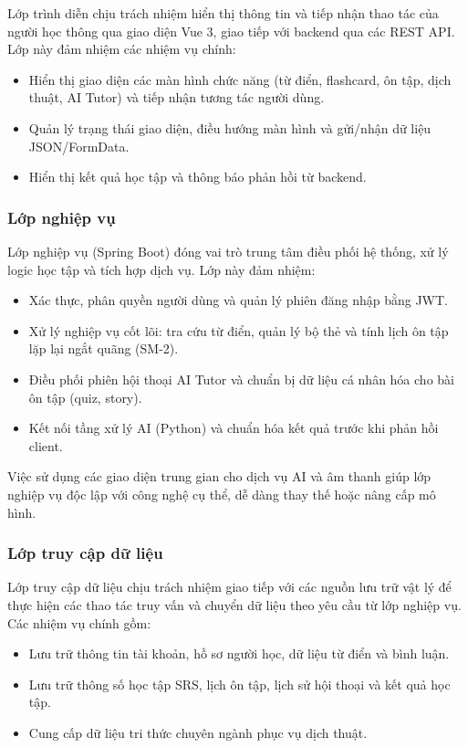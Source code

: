 \documentclass[../DoAn.tex]{subfiles}
\begin{document}
Lớp trình diễn chịu trách nhiệm hiển thị thông tin và tiếp nhận thao tác của người học thông qua giao diện Vue 3, giao tiếp với backend qua các REST API. Lớp này đảm nhiệm các nhiệm vụ chính:

\begin{itemize}
    \item Hiển thị giao diện các màn hình chức năng (từ điển, flashcard, ôn tập, dịch thuật, AI Tutor) và tiếp nhận tương tác người dùng.
    \item Quản lý trạng thái giao diện, điều hướng màn hình và gửi/nhận dữ liệu JSON/FormData.
    \item Hiển thị kết quả học tập và thông báo phản hồi từ backend.
\end{itemize}

\subsubsection{Lớp nghiệp vụ}

Lớp nghiệp vụ (Spring Boot) đóng vai trò trung tâm điều phối hệ thống, xử lý logic học tập và tích hợp dịch vụ. Lớp này đảm nhiệm:

\begin{itemize}
    \item Xác thực, phân quyền người dùng và quản lý phiên đăng nhập bằng JWT.
    \item Xử lý nghiệp vụ cốt lõi: tra cứu từ điển, quản lý bộ thẻ và tính lịch ôn tập lặp lại ngắt quãng (SM-2).
    \item Điều phối phiên hội thoại AI Tutor và chuẩn bị dữ liệu cá nhân hóa cho bài ôn tập (quiz, story).
    \item Kết nối tầng xử lý AI (Python) và chuẩn hóa kết quả trước khi phản hồi client.
\end{itemize}

Việc sử dụng các giao diện trung gian cho dịch vụ AI và âm thanh giúp lớp nghiệp vụ độc lập với công nghệ cụ thể, dễ dàng thay thế hoặc nâng cấp mô hình.

\subsubsection{Lớp truy cập dữ liệu}

Lớp truy cập dữ liệu chịu trách nhiệm giao tiếp với các nguồn lưu trữ vật lý để thực hiện các thao tác truy vấn và chuyển dữ liệu theo yêu cầu từ lớp nghiệp vụ. Các nhiệm vụ chính gồm:

\begin{itemize}
    \item Lưu trữ thông tin tài khoản, hồ sơ người học, dữ liệu từ điển và bình luận.
    \item Lưu trữ thông số học tập SRS, lịch ôn tập, lịch sử hội thoại và kết quả học tập.
    \item Cung cấp dữ liệu tri thức chuyên ngành phục vụ dịch thuật.
\end{itemize}
\end{document}
